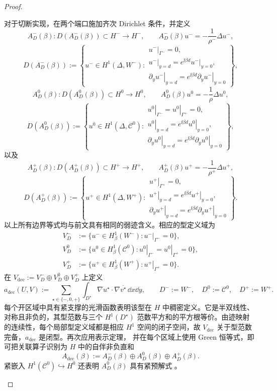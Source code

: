 \begin{proof}
\begin{enumerate}[label=\textit{步骤 \arabic*.},leftmargin=*]
对于切断实现，在两个端口施加齐次 Dirichlet 条件，并定义
\[
  A_D^- (\beta):D(A_D^-(\beta))\subset H^-\longrightarrow H^- ,
  \qquad A_D^-(\beta)u^-=-\frac1{\rho^-}\Delta u^- ,
\]
\[
  D(A_D^-(\beta)):=\left\{u^-\in H^1(\Delta,W^-):
  \begin{array}{l}
    \left.u^-\right|_{\Gamma^-}=0,\\
    \left.u^-\right|_{y=d}
      =e^{\ii\beta d}\left.u^-\right|_{y=0},\\[-1mm]
    \left.\partial_yu^-\right|_{y=d}
      =e^{\ii\beta d}\left.\partial_yu^-\right|_{y=0}
  \end{array}\right\},
\]
\[
  A_D^0(\beta):D(A_D^0(\beta))\subset H^0\longrightarrow H^0,
  \qquad A_D^0(\beta)u^0=-\frac1\rho\Delta u^0,
\]
\[
  D(A_D^0(\beta)):=\left\{u^0\in H^1(\Delta,\mathcal C^0):
  \begin{array}{l}
    \left.u^0\right|_{\Gamma^-}
      =\left.u^0\right|_{\Gamma^+}=0,\\
    \left.u^0\right|_{y=d}
      =e^{\ii\beta d}\left.u^0\right|_{y=0},\\[-1mm]
    \left.\partial_yu^0\right|_{y=d}
      =e^{\ii\beta d}\left.\partial_yu^0\right|_{y=0}
  \end{array}\right\},
\]
以及
\[
  A_D^+(\beta):D(A_D^+(\beta))\subset H^+\longrightarrow H^+,
  \qquad A_D^+(\beta)u^+=-\frac1{\rho^+}\Delta u^+,
\]
\[
  D(A_D^+(\beta)):=\left\{u^+\in H^1(\Delta,W^+):
  \begin{array}{l}
    \left.u^+\right|_{\Gamma^+}=0,\\
    \left.u^+\right|_{y=d}
      =e^{\ii\beta d}\left.u^+\right|_{y=0},\\[-1mm]
    \left.\partial_yu^+\right|_{y=d}
      =e^{\ii\beta d}\left.\partial_yu^+\right|_{y=0}
  \end{array}\right\}.
\]
以上所有边界等式均与前文具有相同的弱迹含义。相应的型定义域为
\[
\begin{aligned}
  V_D^-&:=\{u^-\in H^1_\beta(W^-):
    \left.u^-\right|_{\Gamma^-}=0\},\\
  V_D^0&:=\{u^0\in H^1_\beta(\mathcal C^0):
    \left.u^0\right|_{\Gamma^-}
    =\left.u^0\right|_{\Gamma^+}=0\},\\
  V_D^+&:=\{u^+\in H^1_\beta(W^+):
    \left.u^+\right|_{\Gamma^+}=0\}.
\end{aligned}
\]
在 $V_{\mathrm{dec}}:=V_D^-\oplus V_D^0\oplus V_D^+$ 上定义
\[
  a_{\mathrm{dec}}(U,V)
  :=\sum_{\star\in\{-,0,+\}}
    \int_{D^\star}\nabla u^\star\cdot\nabla\overline{v^\star}
      \,\dd x\dd y,
  \qquad
  D^-:=W^-,\quad D^0:=\mathcal C^0,\quad D^+:=W^+.
\]
每个开区域中具有紧支撑的光滑函数表明该型在 $H$ 中稠密定义。它是半双线性、
对称且非负的，其型范数与三个 $H^1(D^\star)$ 范数平方和的平方根等价。由迹映射
的连续性，每个局部型定义域都是相应 $H^1$ 空间的闭子空间，故
$V_{\mathrm{dec}}$ 关于型范数完备，$a_{\mathrm{dec}}$ 是闭型。再次应用表示定理，
并在每个区域上使用 Green 恒等式，即可把关联算子识别为 $H$ 中的自伴非负直和
\[
  A_{\mathrm{dec}}(\beta)
  :=A_D^-(\beta)\oplus A_D^0(\beta)\oplus A_D^+(\beta).
\]
紧嵌入 $H^1(\mathcal C^0)\hookrightarrow H^0$ 还表明
$A_D^0(\beta)$ 具有紧预解式 \cite[Chapter~3]{McLean2000}。


\end{enumerate}
\end{proof}
